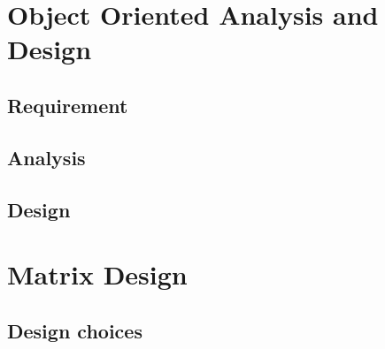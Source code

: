 \section{Object Oriented Analysis and Design}

\subsection{Requirement}

\subsection{Analysis}

\subsection{Design}

\section{Matrix Design}

\subsection{Design choices}

